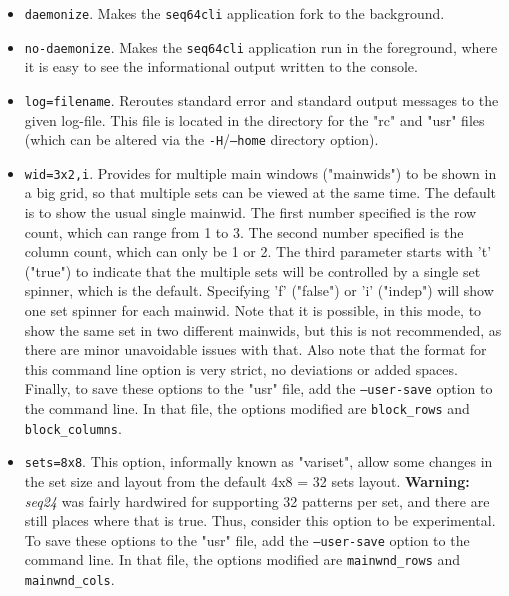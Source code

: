       \begin{itemize}
         \item \texttt{daemonize}.
            Makes the \texttt{seq64cli} application
            fork to the background.
         \item \texttt{no-daemonize}.
            Makes the \texttt{seq64cli} application
            run in the foreground, where it is easy to see the informational
            output written to the console.
         \item \texttt{log=filename}.
            Reroutes standard error and standard
            output messages to the given log-file.  This file is located in the
            directory for the "rc" and "usr" files (which can be altered via
            the \texttt{-H}/\texttt{--home} directory option).
         \item \texttt{wid=3x2,i}.
            Provides for multiple main windows ("mainwids") to be shown in a
            big grid, so that multiple sets can be viewed at the same time.
            The default is to show the usual single mainwid.
            The first number specified is the row count, which can range from 1
            to 3.  The second number specified is the column count, which can
            only be 1 or 2.  The third parameter starts with 't' ("true")
            to indicate that the multiple sets will be controlled by a single
            set spinner, which is the default.  Specifying 'f' ("false") or 'i'
            ("indep") will show one set spinner for each mainwid.  Note that it
            is possible, in this mode, to show the same set in two different
            mainwids, but this is not recommended, as there are minor
            unavoidable issues with that.  Also note that the format for this
            command line option is very strict, no deviations or added spaces.
            Finally, to save these options to the "usr" file, add the
            \texttt{--user-save} option to the command line.
            In that file, the options modified are \texttt{block\_rows} and
            \texttt{block\_columns}.
         \item \texttt{sets=8x8}.
            This option, informally known as "variset", allow some changes in
            the set size and layout from the default 4x8 = 32 sets layout.
            \textbf{Warning:}
            \textsl{seq24} was fairly hardwired for supporting 32 patterns per
            set, and there are still places where that is true.  Thus,
            consider this option to be experimental.
            To save these options to the "usr" file, add the
            \texttt{--user-save} option to the command line.
            In that file, the options modified are \texttt{mainwnd\_rows} and
            \texttt{mainwnd\_cols}.
      \end{itemize}

